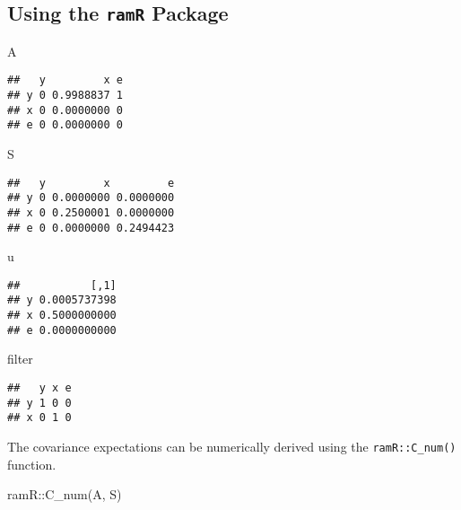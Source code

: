 \documentclass[
]{book}
\newenvironment{Shaded}{\begin{snugshade}}{\end{snugshade}}
\newcommand{\FunctionTok}[1]{\textcolor[rgb]{0.00,0.00,0.00}{#1}}
\newcommand{\NormalTok}[1]{#1}
\newcommand{\SpecialCharTok}[1]{\textcolor[rgb]{0.00,0.00,0.00}{#1}}
\theoremstyle{definition}
\theoremstyle{definition}
\theoremstyle{definition}
\theoremstyle{remark}
\begin{document}
\hypertarget{using-the-ramr-package-1}{%
\subsection{\texorpdfstring{Using the \texttt{ramR} Package}{Using the ramR Package}}\label{using-the-ramr-package-1}}

\begin{Shaded}
\begin{Highlighting}[]
\NormalTok{A}
\end{Highlighting}
\end{Shaded}

\begin{verbatim}
##   y         x e
## y 0 0.9988837 1
## x 0 0.0000000 0
## e 0 0.0000000 0
\end{verbatim}

\begin{Shaded}
\begin{Highlighting}[]
\NormalTok{S}
\end{Highlighting}
\end{Shaded}

\begin{verbatim}
##   y         x         e
## y 0 0.0000000 0.0000000
## x 0 0.2500001 0.0000000
## e 0 0.0000000 0.2494423
\end{verbatim}

\begin{Shaded}
\begin{Highlighting}[]
\NormalTok{u}
\end{Highlighting}
\end{Shaded}

\begin{verbatim}
##           [,1]
## y 0.0005737398
## x 0.5000000000
## e 0.0000000000
\end{verbatim}

\begin{Shaded}
\begin{Highlighting}[]
\NormalTok{filter}
\end{Highlighting}
\end{Shaded}

\begin{verbatim}
##   y x e
## y 1 0 0
## x 0 1 0
\end{verbatim}

The covariance expectations
can be numerically derived using the \texttt{ramR::C\_num()} function.

\begin{Shaded}
\begin{Highlighting}[]
\NormalTok{ramR}\SpecialCharTok{::}\FunctionTok{C\_num}\NormalTok{(A, S)}
\end{Highlighting}
\end{Shaded}
\end{document}
